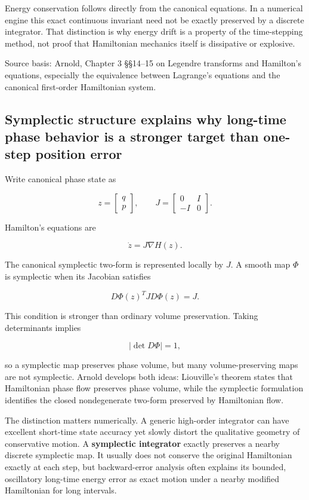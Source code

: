 Energy conservation follows directly from the canonical equations. In a numerical engine this exact continuous invariant need not be exactly preserved by a discrete integrator. That distinction is why energy drift is a property of the time-stepping method, not proof that Hamiltonian mechanics itself is dissipative or explosive.

Source basis: Arnold, Chapter 3 §§14--15 on Legendre transforms and Hamilton's equations, especially the equivalence between Lagrange's equations and the canonical first-order Hamiltonian system.

\subsection{Symplectic structure explains why long-time phase behavior is a stronger target than one-step position error}\label{02-foundations-ii-ch039-symplectic-structure-explains-why-long-time-phase-behavior-is-a-stronger-target-than-one-step-position-error}

Write canonical phase state as

\[
z=
\begin{bmatrix}
q\\p
\end{bmatrix},
\qquad
J=
\begin{bmatrix}
0&I\\
-I&0
\end{bmatrix}.
\]

Hamilton's equations are

\[
\dot z
=
J\nabla H(z).
\]

The canonical symplectic two-form is represented locally by \(J\). A smooth map \(\Phi\) is symplectic when its Jacobian satisfies

\[
D\Phi(z)^T J D\Phi(z)=J.
\]

This condition is stronger than ordinary volume preservation. Taking determinants implies

\[
|\det D\Phi|=1,
\]

so a symplectic map preserves phase volume, but many volume-preserving maps are not symplectic. Arnold develops both ideas: Liouville's theorem states that Hamiltonian phase flow preserves phase volume, while the symplectic formulation identifies the closed nondegenerate two-form preserved by Hamiltonian flow.

The distinction matters numerically. A generic high-order integrator can have excellent short-time state accuracy yet slowly distort the qualitative geometry of conservative motion. A \textbf{symplectic integrator} exactly preserves a nearby discrete symplectic map. It usually does not conserve the original Hamiltonian exactly at each step, but backward-error analysis often explains its bounded, oscillatory long-time energy error as exact motion under a nearby modified Hamiltonian for long intervals.

